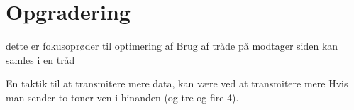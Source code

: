 \section{Opgradering}
dette er fokusoprøder til optimering af 
Brug af tråde på modtager siden kan samles i en tråd

En taktik til at transmitere mere data, kan være ved at transmitere mere 
Hvis man sender to toner ven i hinanden  (og tre og fire 4). 